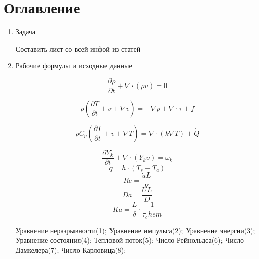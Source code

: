 \documentclass[a4paper,11pt]{article}
\begin{document}
\section{Оглавление}
\begin{enumerate}
	\item Задача 
	
	Составить лист со всей инфой из статей

	\item Рабочие формулы и исходные данные
	
    \begin{multicols}{2}

        \begin{equation}\label{eq:i1} 
        \frac{\partial \rho}{\partial t} +\nabla \cdot (\rho v)=0
        \end{equation}  
         
         \begin{equation}\label{eq:i2}  
             \rho(\frac{\partial T}{\partial t}+v+\nabla v)=-\nabla p + \nabla \cdot \tau + f
         \end{equation}    
         
         \begin{equation}  \label{eq:i3} 
            \rho C_p(\frac{\partial T}{\partial t}+v+\nabla T)= \nabla \cdot (k\nabla T)+ \dot{Q} 
         \end{equation} 
         
         \begin{equation}  \label{eq:i4} 
            \frac{\partial Y_k}{\partial t}+\nabla\cdot(Y_kv)=\dot{\omega}_k
         \end{equation} 
         \begin{equation}   \label{eq:i5}
            q = h\cdot(T_s - T_a)
         \end{equation}
         \begin{equation}   \label{eq:i6}
            Re = \frac{\dot{u}L}{\nu}
         \end{equation}
         \begin{equation}   \label{eq:i7}
            Da = \frac{UL}{D}
         \end{equation}
         \begin{equation}   \label{eq:i8}
            Ka = \frac{L}{\delta }\cdot\frac{1}{\tau _chem}
         \end{equation}
         \end{multicols}
    
         Уравнение неразрывности(1); 
         Уравнение импульса(2); 
         Уравнение энергии(3); 
         Уравнение состояния(4); 
         Тепловой поток(5);
         Число Рейнольдса(6);
         Число Дамкелера(7);
         Число Карловица(8);
    \end{enumerate}
\end{document}
